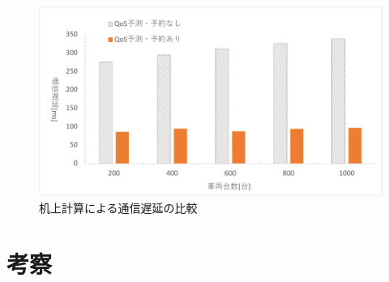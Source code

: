 \documentclass[a4paper,11pt,uplatex]{ujreport}
\begin{document}
\begin{figure}[tb]
  \centering
  \includegraphics[width=\linewidth]{img/机上計算による通信遅延の比較.pdf}
  \caption{机上計算による通信遅延の比較}
  \label{fig:Mathdelay}
\end{figure}


\chapter{考察}
\label{chap:考察}
\end{document}
